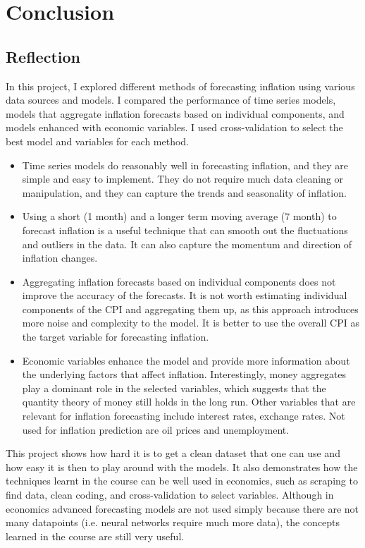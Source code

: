 \documentclass[12pt]{article}
\begin{document}
\section{Conclusion}
\subsection{Reflection}

In this project, I explored different methods of forecasting inflation using various data sources and models. I compared the performance of time series models, models that aggregate inflation forecasts based on individual components, and models enhanced with economic variables. I used cross-validation to select the best model and variables for each method.


\begin{itemize}
\item Time series models do reasonably well in forecasting inflation, and they are simple and easy to implement. They do not require much data cleaning or manipulation, and they can capture the trends and seasonality of inflation.
\item Using a short (1 month) and a longer term moving average (7 month) to forecast inflation is a useful technique that can smooth out the fluctuations and outliers in the data. It can also capture the momentum and direction of inflation changes.
\item Aggregating inflation forecasts based on individual components does not improve the accuracy of the forecasts. It is not worth estimating individual components of the CPI and aggregating them up, as this approach introduces more noise and complexity to the model. It is better to use the overall CPI as the target variable for forecasting inflation.
\item Economic variables enhance the model and provide more information about the underlying factors that affect inflation. Interestingly, money aggregates play a dominant role in the selected variables, which suggests that the quantity theory of money still holds in the long run. Other variables that are relevant for inflation forecasting include interest rates, exchange rates. Not used for inflation prediction are oil prices and unemployment. 
\end{itemize}
This project shows how hard it is to get a clean dataset that one can use and how easy it is then to play around with the models. It also demonstrates how the techniques learnt in the course can be well used in economics, such as scraping to find data, clean coding, and cross-validation to select variables. Although in economics advanced forecasting models are not used simply because there are not many datapoints (i.e. neural networks require much more data), the concepts learned in the course are still very useful.
\end{document}
